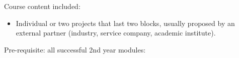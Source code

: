 Course content included:
\begin{itemize}
    \item Individual or two projects that last two blocks, usually proposed by an external partner (industry, service company, academic institute).
\end{itemize}
Pre-requisite: all successful 2nd year modules:
